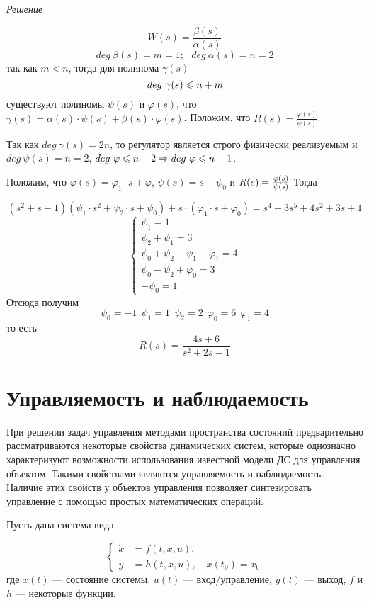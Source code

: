 \documentclass[../../TAU.tex]{subfiles}
\begin{document}
    \textit{Решение}
    {
        $$
            W(s)=\frac{\beta(s)}{\alpha(s)}
        $$
        $$
            deg\ \beta(s)=m=1;\ \ \ deg\ \alpha(s)=n=2
        $$
        так как $m<n$, тогда для полинома $\gamma(s)$
        $$
            deg\ \gamma(s)\leqslant n+m
        $$
        существуют полиномы $\psi(s)$ и $\varphi(s)$, что $\gamma(s)=\alpha(s)\cdot\psi(s)+\beta(s)\cdot\varphi(s)$.
        Положим, что $R(s)=\frac{\varphi(s)}{\psi(s)}$.


        Так как $deg\ \gamma(s)=2n$, то регулятор является строго физически реализуемым и $deg\ \psi(s)=n=2$, $deg\ \varphi\lse n-2\Rightarrow deg\ \varphi\lse n-1$.

        Положим, что $\varphi(s)=\varphi_1\cdot s+\varphi$, $\psi(s)=s+\psi_0$ и 
        $R(s)={\varphi(s)\over\psi(s)}$
        Тогда

        $$
            (s^2+s-1)(\psi_1\cdot s^2+\psi_2\cdot s+\psi_0)+s\cdot(\varphi_1\cdot s+\varphi_0)=s^4+3s^5+4s^2+3s+1
        $$
        $$
        \begin{cases}
            \psi_1=1\\
            \psi_2+\psi_1=3\\
            \psi_0+\psi_2-\psi_1+\varphi_1=4\\
            \psi_0-\psi_2+\varphi_0=3\\
            -\psi_0=1
        \end{cases}
        $$
        Отсюда получим
        $$
        \psi_0=-1\ \ \psi_1=1\ \ \psi_2=2\ \ \varphi_0=6\ \ \varphi_1=4
        $$
        то есть
        $$
            R(s)=\frac{4s+6}{s^2+2s-1}
        $$
    }



\section{Управляемость и наблюдаемость \cite[стр. 269]{voron}}

    При решении задач управления методами пространства состояний предварительно рассматриваются некоторые свойства динамических систем, которые однозначно характеризуют возможности использования известной модели ДС для управления объектом. 
    Такими свойствами являются управляемость и наблюдаемость. 
    Наличие этих свойств у объектов управления позволяет синтезировать управление с помощью простых математических операций.
    \cite[стр. 62]{yashin} 

    Пусть дана система вида

    \begin{equation}\label{GEN_DS}
        \left\{
        \begin{aligned}
            \dot x &= f(t,x,u),\\
            y &= h(t,x,u),\quad x(t_0) = x_0
        \end{aligned}
        \right.
    \end{equation}
    где $x(t)$ --- состояние системы, $u(t)$ --- вход/управление, $y(t)$ --- выход, $f$ и $h$ --- некоторые функции.
\end{document}
